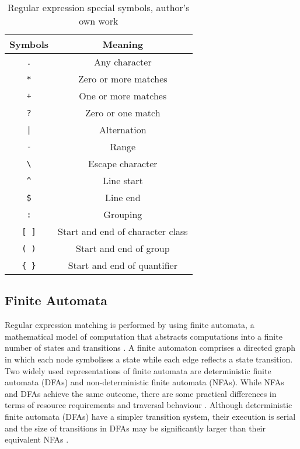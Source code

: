 \documentclass[10pt,onecolumn,twoside,english,a4paper]{article}
\begin{document}
\begin{table}[h!]
  \centering
  \begin{tabular}{ |c|c| }
    \hline
    \textbf{Symbols}        & \textbf{Meaning}                 \\
    \hline
    \texttt{.}              & Any character                    \\
    \hline
    \texttt{*}              & Zero or more matches             \\
    \hline
    \texttt{+}              & One or more matches              \\
    \hline
    \texttt{?}              & Zero or one match                \\
    \hline
    \texttt{|}              & Alternation                      \\
    \hline
    \texttt{-}              & Range                            \\
    \hline
    \texttt{\textbackslash} & Escape character                 \\
    \hline
    \texttt{\^{}}           & Line start                       \\
    \hline
    \texttt{\$}             & Line end                         \\
    \hline
    \texttt{:}              & Grouping                         \\
    \hline
    \texttt{[ ]}            & Start and end of character class \\
    \hline
    \texttt{( )}            & Start and end of group           \\
    \hline
    \texttt{\{ \}}          & Start and end of quantifier      \\
    \hline
  \end{tabular}
  \caption{Regular expression special symbols, author's own work }
  \label{table:regex_special_symbols}
\end{table}

\subsection{Finite Automata} \label{Finite Automata}
Regular expression matching is performed by using finite automata, a mathematical model of computation that abstracts computations into a finite number of states and transitions \cite{Becchi:regex_large_dataset}. A finite automaton comprises a directed graph in which each node symbolises a state while each edge reflects a state transition.
Two widely used representations of finite automata are deterministic finite automata (DFAs) and non-deterministic finite automata (NFAs). While NFAs and DFAs achieve the same outcome, there are some practical differences in terms of resource requirements and traversal behaviour \cite{Nourian:DemystifyingFSA}.
Although deterministic finite automata (DFAs) have a simpler transition system, their execution is serial and the size of transitions in DFAs may be significantly larger than their equivalent NFAs \cite{Liu:Asynchronous,Liu:WhyGPUSlowNFA}.
\end{document}
